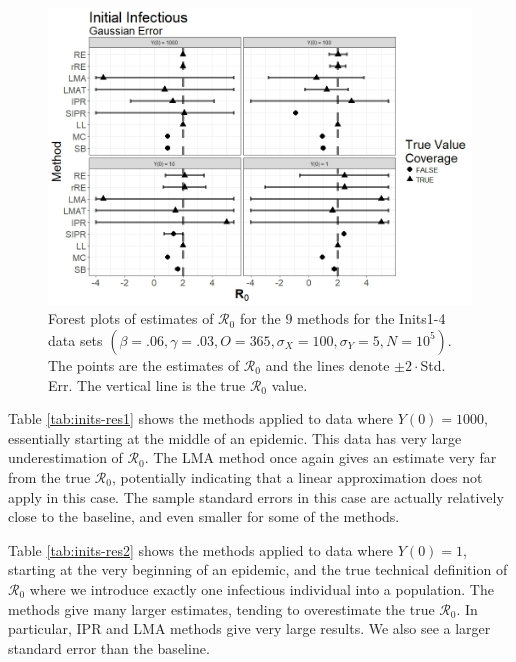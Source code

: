 \documentclass[12pt]{article}
\newcommand{\xxsir}{\ensuremath{9} } %
\newcommand{\rr}{\ensuremath{\mathcal{R}_0}}
\begin{document}
\begin{figure}[H]
  \centering
  \includegraphics[scale=0.5]{images/start_n.jpeg}
    \caption{Forest plots of estimates of $\rr$ for the \xxsir methods for the Inits1-4 data sets $(\beta=.06, \gamma=.03, O=365, \sigma_X=100, \sigma_Y=5, N=10^5)$.  The points are the estimates of $\rr$ and the lines denote $\pm 2\cdot $Std. Err.  The vertical line is the true $\rr$ value.}\label{fig:inits-res}
  \end{figure}

  Table \ref{tab:inits-res1} shows the methods applied to data where $Y(0) = 1000$, essentially starting at the middle of an epidemic. This data has very large underestimation of $\rr$. The LMA method once again gives an estimate very far from the true $\rr$, potentially indicating that a linear approximation does not apply in this case. The sample standard errors in this case are actually relatively close to the baseline, and even smaller for some of the methods.

Table \ref{tab:inits-res2} shows the methods applied to data where $Y(0) = 1$, starting at the very beginning of an epidemic, and the true technical definition of $\rr$ where we introduce exactly one infectious individual into a population. The methods give many larger estimates, tending to overestimate the true $\rr$. In particular, IPR and LMA methods give very large results. We also see a larger standard error than the baseline.
\end{document}
